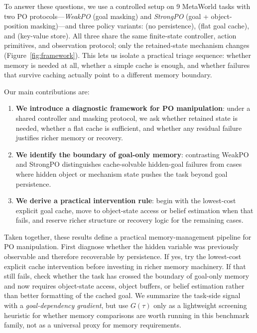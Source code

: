 To answer these questions, we use a controlled setup on 9 MetaWorld \citep{Yu2020} tasks with two PO protocols---\emph{WeakPO} (goal masking) and \emph{StrongPO} (goal + object-position masking)---and three policy variants:  (no persistence),  (flat goal cache), and  (key-value store). All three share the same finite-state controller, action primitives, and observation protocol; only the retained-state mechanism changes (Figure~\ref{fig:framework}). This lets us isolate a practical triage sequence: whether memory is needed at all, whether a simple cache is enough, and whether failures that survive caching actually point to a different memory boundary.

Our main contributions are:

\begin{enumerate}
    \item \textbf{We introduce a diagnostic framework for PO manipulation}: under a shared controller and masking protocol, we ask whether retained state is needed, whether a flat cache is sufficient, and whether any residual failure justifies richer memory or recovery.
    \item \textbf{We identify the boundary of goal-only memory}: contrasting WeakPO and StrongPO distinguishes cache-solvable hidden-goal failures from cases where hidden object or mechanism state pushes the task beyond goal persistence.
    \item \textbf{We derive a practical intervention rule}: begin with the lowest-cost explicit goal cache, move to object-state access or belief estimation when that fails, and reserve richer structure or recovery logic for the remaining cases.
\end{enumerate}

Taken together, these results define a practical memory-management pipeline for PO manipulation. First diagnose whether the hidden variable was previously observable and therefore recoverable by persistence. If yes, try the lowest-cost explicit cache intervention before investing in richer memory machinery. If that still fails, check whether the task has crossed the boundary of goal-only memory and now requires object-state access, object buffers, or belief estimation rather than better formatting of the cached goal. We summarize the task-side signal with a \emph{goal-dependency gradient}, but use $G(\tau)$ only as a lightweight screening heuristic for whether memory comparisons are worth running in this benchmark family, not as a universal proxy for memory requirements.
